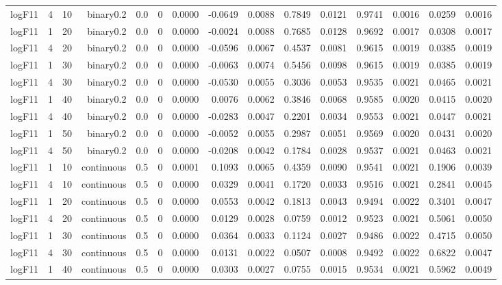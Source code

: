 \begin{longtable}{rrrrrrrrrrrrrrr}
  logF11 & 4 & 10 & binary0.2 & 0.0 & 0 & 0.0000 & -0.0649 & 0.0088 & 0.7849 & 0.0121 & 0.9741 & 0.0016 & 0.0259 & 0.0016 \\ 
  logF11 & 1 & 20 & binary0.2 & 0.0 & 0 & 0.0000 & -0.0024 & 0.0088 & 0.7685 & 0.0128 & 0.9692 & 0.0017 & 0.0308 & 0.0017 \\ 
  logF11 & 4 & 20 & binary0.2 & 0.0 & 0 & 0.0000 & -0.0596 & 0.0067 & 0.4537 & 0.0081 & 0.9615 & 0.0019 & 0.0385 & 0.0019 \\ 
  logF11 & 1 & 30 & binary0.2 & 0.0 & 0 & 0.0000 & -0.0063 & 0.0074 & 0.5456 & 0.0098 & 0.9615 & 0.0019 & 0.0385 & 0.0019 \\ 
  logF11 & 4 & 30 & binary0.2 & 0.0 & 0 & 0.0000 & -0.0530 & 0.0055 & 0.3036 & 0.0053 & 0.9535 & 0.0021 & 0.0465 & 0.0021 \\ 
  logF11 & 1 & 40 & binary0.2 & 0.0 & 0 & 0.0000 & 0.0076 & 0.0062 & 0.3846 & 0.0068 & 0.9585 & 0.0020 & 0.0415 & 0.0020 \\ 
  logF11 & 4 & 40 & binary0.2 & 0.0 & 0 & 0.0000 & -0.0283 & 0.0047 & 0.2201 & 0.0034 & 0.9553 & 0.0021 & 0.0447 & 0.0021 \\ 
  logF11 & 1 & 50 & binary0.2 & 0.0 & 0 & 0.0000 & -0.0052 & 0.0055 & 0.2987 & 0.0051 & 0.9569 & 0.0020 & 0.0431 & 0.0020 \\ 
  logF11 & 4 & 50 & binary0.2 & 0.0 & 0 & 0.0000 & -0.0208 & 0.0042 & 0.1784 & 0.0028 & 0.9537 & 0.0021 & 0.0463 & 0.0021 \\ 
  logF11 & 1 & 10 & continuous & 0.5 & 0 & 0.0001 & 0.1093 & 0.0065 & 0.4359 & 0.0090 & 0.9541 & 0.0021 & 0.1906 & 0.0039 \\ 
  logF11 & 4 & 10 & continuous & 0.5 & 0 & 0.0000 & 0.0329 & 0.0041 & 0.1720 & 0.0033 & 0.9516 & 0.0021 & 0.2841 & 0.0045 \\ 
  logF11 & 1 & 20 & continuous & 0.5 & 0 & 0.0000 & 0.0553 & 0.0042 & 0.1813 & 0.0043 & 0.9494 & 0.0022 & 0.3401 & 0.0047 \\ 
  logF11 & 4 & 20 & continuous & 0.5 & 0 & 0.0000 & 0.0129 & 0.0028 & 0.0759 & 0.0012 & 0.9523 & 0.0021 & 0.5061 & 0.0050 \\ 
  logF11 & 1 & 30 & continuous & 0.5 & 0 & 0.0000 & 0.0364 & 0.0033 & 0.1124 & 0.0027 & 0.9486 & 0.0022 & 0.4715 & 0.0050 \\ 
  logF11 & 4 & 30 & continuous & 0.5 & 0 & 0.0000 & 0.0131 & 0.0022 & 0.0507 & 0.0008 & 0.9492 & 0.0022 & 0.6822 & 0.0047 \\ 
  logF11 & 1 & 40 & continuous & 0.5 & 0 & 0.0000 & 0.0303 & 0.0027 & 0.0755 & 0.0015 & 0.9534 & 0.0021 & 0.5962 & 0.0049 \\ 

\end{longtable}
